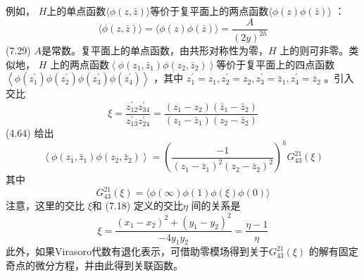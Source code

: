 例如， $H $上的单点函数$ \langle\phi(z, \bar{z})\rangle $等价于复平面上的两点函数$ \langle\phi(z) \phi(\bar{z})\rangle$ ：
\begin{equation}
	\langle\phi(z, \bar{z})\rangle=\langle\phi(z) \phi(\bar{z})\rangle=\frac{A}{(2 y)^{2 h}}
\end{equation} \quad \quad (7.29)
$A $是常数。复平面上的单点函数，由共形对称性为零，$ H$ 上的则可非零。类似地， $H$ 上的两点函数$ \left\langle\phi\left(z_{1}, \bar{z}_{1}\right) \phi\left(z_{2}, \bar{z}_{2}\right)\right\rangle $等价于复平面上的四点函数$ \left\langle\phi\left(z_{1}^{\prime}\right) \phi\left(z_{2}^{\prime}\right) \phi\left(z_{3}^{\prime}\right) \phi\left(z_{4}^{\prime}\right)\right\rangle$ ，其中 $z_{1}^{\prime}=z_{1}, z_{2}^{\prime}=z_{2}, z_{3}^{\prime}=\bar{z}_{1} , z_{4}^{\prime}=\bar{z}_{2}$ 。引入交比
\begin{equation}
	\xi=\frac{z_{12}^{\prime} z_{34}^{\prime}}{z_{13}^{\prime} z_{24}^{\prime}}=\frac{\left(z_{1}-z_{2}\right)\left(\bar{z}_{1}-\bar{z}_{2}\right)}{\left(z_{1}-\bar{z}_{1}\right)\left(z_{2}-\bar{z}_{2}\right)}
\end{equation} 
(4.64) 给出
\begin{equation}
	\left\langle\phi\left(z_{1}, \bar{z}_{1}\right) \phi\left(z_{2}, \bar{z}_{2}\right)\right\rangle=\left(\frac{-1}{\left(z_{1}-\bar{z}_{1}\right)^{2}\left(z_{2}-\bar{z}_{2}\right)^{2}}\right)^{h} G_{43}^{21}(\xi)
\end{equation}
其中
\begin{equation}
	G_{43}^{21}(\xi)=\langle\phi(\infty) \phi(1) \phi(\xi) \phi(0)\rangle
\end{equation} 
注意，这里的交比 $\xi $和 (7.18) 定义的交比$ \eta$ 间的关系是
\begin{equation}
	\xi=\frac{\left(x_{1}-x_{2}\right)^{2}+\left(y_{1}-y_{2}\right)^{2}}{-4 y_{1} y_{2}}=\frac{\eta-1}{\eta} 
\end{equation}
此外，如果Virasoro代数有退化表示，可借助零模场得到关于$ G_{43}^{21}(\xi)$ 的解有固定奇点的微分方程，并由此得到关联函数。

